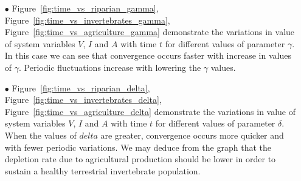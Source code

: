 \documentclass[12pt]{article}
\numberwithin{equation}{section}
\begin{document}
\begin{itemize}
\item[$\bullet$] Figure~\ref{fig:time_vs_riparian_gamma}, Figure~\ref{fig:time_vs_invertebrates_gamma}, Figure~\ref{fig:time_vs_agriculture_gamma} demonstrate the variations in value of system variables $V$, $I$ and $A$ with time $t$ for different values of parameter $\gamma$. In this case we can see that convergence occurs faster with increase in values of $\gamma$. Periodic fluctuations increase with lowering the $\gamma$ values. 

\item[$\bullet$] Figure~\ref{fig:time_vs_riparian_delta}, Figure~\ref{fig:time_vs_invertebrates_delta}, Figure~\ref{fig:time_vs_agriculture_delta} demonstrate the variations in value of system variables $V$, $I$ and $A$ with time $t$ for different values of parameter $\delta$. When the values of $delta$ are greater, convergence occurs more quicker and with fewer periodic variations. We may deduce from the graph that the depletion rate due to agricultural production should be lower in order to sustain a healthy terrestrial invertebrate population.
\end{itemize}
\end{document}
